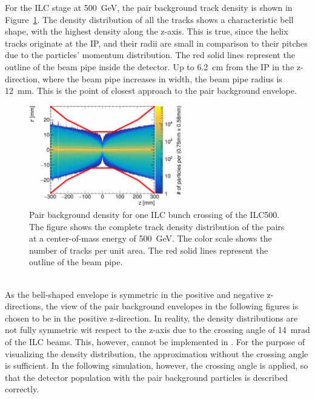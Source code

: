For the ILC stage at \SI{500}{\GeV}, the pair background track density is shown in Figure~\ref{fig:PairBkg:Density}.
The density distribution of all the tracks shows a characteristic bell shape, with the highest density along the z-axis.
This is true, since the helix tracks originate at the IP, and their radii are small in comparison to their pitches due to the particles' momentum distribution.
The red solid lines represent the outline of the beam pipe inside the \sid detector.
Up to \SI{6.2}{\centi\meter} from the IP in the z-direction, where the beam pipe increases in width, the beam pipe radius is \SI{12}{\milli\meter}.
This is the point of closest approach to the pair background envelope.
\begin{figure}[!h]
    \centering
    \includegraphics[width=0.6\textwidth]{Figures/Pairs/Helix_tracks_xz_ILC500.pdf}
    \caption[Pair background density for the ILC500]{
    Pair background density for one ILC bunch crossing of the ILC500.
   The figure shows the complete track density distribution of the pairs at a center-of-mass energy of \SI[detect-all]{500}{\GeV}.
   The color scale shows the number of tracks per unit area.
   The red solid lines represent the outline of the beam pipe.
    }
    \label{fig:PairBkg:Density}
\end{figure}
\\As the bell-shaped envelope is symmetric in the positive and negative z-directions, the view of the pair background envelopes in the following figures is chosen to be in the positive z-direction.
In reality, the density distributions are not fully symmetric wit respect to the z-axis due to the crossing angle of \SI{14}{\milli\radian} of the ILC beams.
This, however, cannot be implemented in \guineapig.
For the purpose of visualizing the density distribution, the approximation without the crossing angle is sufficient.
In the following \geant simulation, however, the crossing angle is applied, so that the detector population with the pair background particles is described correctly.
